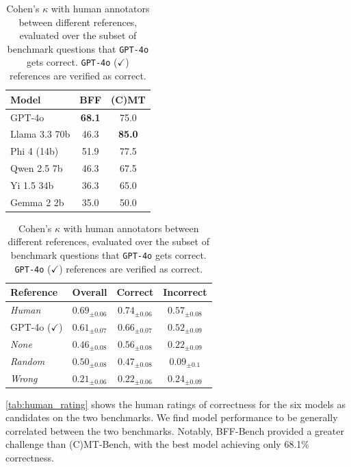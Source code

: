 \documentclass{article}
\begin{document}
\begin{table}[t]
\centering
\begin{minipage}{0.4\textwidth}
\centering
\begin{tabular}{lcc}
\toprule
Model & BFF & (C)MT \\
\midrule
GPT-4o & \textbf{68.1} & 75.0 \\
Llama 3.3 70b & 46.3 & \textbf{85.0} \\
Phi 4 (14b) & 51.9 & 77.5 \\
Qwen 2.5 7b & 46.3 & 67.5 \\
Yi 1.5 34b & 36.3 & 65.0 \\
Gemma 2 2b & 35.0 & 50.0 \\
\bottomrule
\end{tabular}
\caption{Correctness (\%) of candidate models on BFF-Bench and (C)MT-Bench as judged by human experts.}
\label{tab:human_rating}
\end{minipage}
\hfill
\begin{minipage}{0.56\textwidth}
\centering
\begin{tabular}{lc|cc}
\toprule
Reference & Overall & Correct & Incorrect \\
\midrule
\textit{Human} & $0.69_{\pm 0.06}$ & $0.74_{\pm 0.06}$ & $0.57_{\pm 0.08}$ \\
GPT-4o ($\checkmark$) & $0.61_{\pm 0.07}$ & $0.66_{\pm 0.07}$ & $0.52_{\pm 0.09}$ \\
\midrule
\textit{None} & $0.46_{\pm 0.08}$ & $0.56_{\pm 0.08}$ & $0.22_{\pm 0.09}$ \\
\textit{Random} & $0.50_{\pm 0.08}$ & $0.47_{\pm 0.08}$ & $0.09_{\pm 0.1}$ \\
\textit{Wrong} & $0.21_{\pm 0.06}$ & $0.22_{\pm 0.06}$ & $0.24_{\pm 0.09}$ \\
\bottomrule
\end{tabular}
\caption{Cohen's $\kappa$ with human annotators between different references, evaluated over the subset of benchmark questions that \texttt{GPT-4o} gets correct. \texttt{GPT-4o} ($\checkmark$) references are verified as correct.}
\label{tab:good-ref}
\end{minipage}
\end{table}


\cref{tab:human_rating} shows the human ratings of correctness for the six models as candidates on the two benchmarks. We find model performance to be generally correlated between the two benchmarks. Notably, BFF-Bench provided a greater challenge than (C)MT-Bench, with the best model achieving only 68.1\% correctness.
\end{document}
